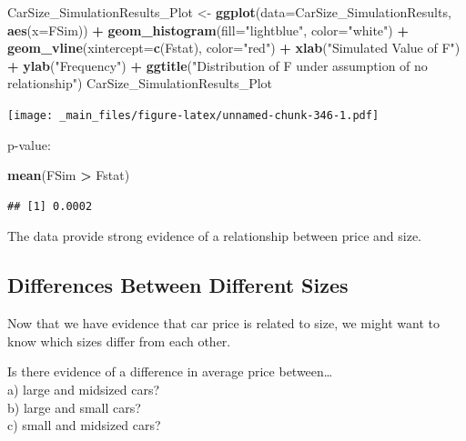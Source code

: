 \documentclass[]{book}
\newenvironment{Shaded}{\begin{snugshade}}{\end{snugshade}}
\newcommand{\KeywordTok}[1]{\textcolor[rgb]{0.13,0.29,0.53}{\textbf{#1}}}
\newcommand{\DataTypeTok}[1]{\textcolor[rgb]{0.13,0.29,0.53}{#1}}
\newcommand{\StringTok}[1]{\textcolor[rgb]{0.31,0.60,0.02}{#1}}
\newcommand{\OperatorTok}[1]{\textcolor[rgb]{0.81,0.36,0.00}{\textbf{#1}}}
\newcommand{\NormalTok}[1]{#1}
\begin{document}
\begin{Shaded}
\begin{Highlighting}[]
\NormalTok{CarSize_SimulationResults_Plot <-}\StringTok{ }\KeywordTok{ggplot}\NormalTok{(}\DataTypeTok{data=}\NormalTok{CarSize_SimulationResults, }\KeywordTok{aes}\NormalTok{(}\DataTypeTok{x=}\NormalTok{FSim)) }\OperatorTok{+}\StringTok{ }
\StringTok{  }\KeywordTok{geom_histogram}\NormalTok{(}\DataTypeTok{fill=}\StringTok{"lightblue"}\NormalTok{, }\DataTypeTok{color=}\StringTok{"white"}\NormalTok{) }\OperatorTok{+}\StringTok{  }\KeywordTok{geom_vline}\NormalTok{(}\DataTypeTok{xintercept=}\KeywordTok{c}\NormalTok{(Fstat), }\DataTypeTok{color=}\StringTok{"red"}\NormalTok{) }\OperatorTok{+}\StringTok{ }
\StringTok{  }\KeywordTok{xlab}\NormalTok{(}\StringTok{"Simulated Value of F"}\NormalTok{) }\OperatorTok{+}\StringTok{ }\KeywordTok{ylab}\NormalTok{(}\StringTok{"Frequency"}\NormalTok{) }\OperatorTok{+}\StringTok{  }\KeywordTok{ggtitle}\NormalTok{(}\StringTok{"Distribution of F under assumption of no relationship"}\NormalTok{)}
\NormalTok{CarSize_SimulationResults_Plot}
\end{Highlighting}
\end{Shaded}

\texttt{[image: \_main\_files/figure-latex/unnamed-chunk-346-1.pdf]}

p-value:

\begin{Shaded}
\begin{Highlighting}[]
\KeywordTok{mean}\NormalTok{(FSim }\OperatorTok{>}\StringTok{ }\NormalTok{Fstat)}
\end{Highlighting}
\end{Shaded}

\begin{verbatim}
## [1] 0.0002
\end{verbatim}

The data provide strong evidence of a relationship between price and
size.

\subsection{Differences Between Different
Sizes}\label{differences-between-different-sizes}

Now that we have evidence that car price is related to size, we might
want to know which sizes differ from each other.

Is there evidence of a difference in average price between\ldots{}\\
a) large and midsized cars?\\
b) large and small cars?\\
c) small and midsized cars?
\end{document}
